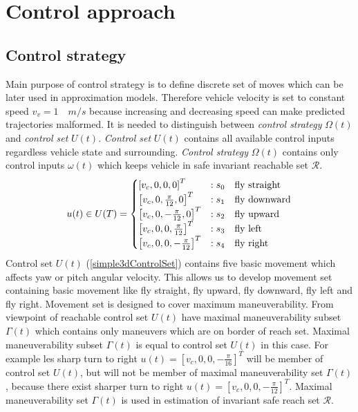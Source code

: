 \chapter{Control approach}\label{ch:controlapproach3D}


\section{Control strategy}\label{sec:3DcontrolSimplisticStrategy}
\noindent Main purpose of control strategy is to define discrete set of moves which can be later used in approximation models. Therefore vehicle velocity is set to constant speed $v_v = 1\quad m/s$ because increasing and decreasing speed can make predicted trajectories malformed. It is needed to distinguish between \textit{control strategy} $\Omega(t)$ and \textit{control set} $U(t)$. \textit{Control set} $U(t)$ contains all available control inputs regardless vehicle state and surrounding. \textit{Control strategy} $\Omega(t)$ contains only control inputs $\omega(t)$ which keeps vehicle in safe invariant reachable set $\mathscr{R}$.
\begin{equation}\label{simple3dControlSet}
    u(t)\in U(T) =
    \begin{cases}
        \left [ v_c,0,0,0 \right ]^T & :s_0 \quad\textnormal{fly straight} \\
        \left [ v_c,0,\frac{\pi}{12},0 \right ]^T & :s_1 \quad\textnormal{fly downward} \\
        \left [ v_c,0,-\frac{\pi}{12},0 \right ]^T & :s_2 \quad\textnormal{fly upward} \\
        \left [ v_c,0,0,\frac{\pi}{12} \right ]^T & :s_3 \quad\textnormal{fly left} \\
        \left [ v_c,0,0,-\frac{\pi}{12} \right ]^T & :s_4 \quad\textnormal{fly right} 
    \end{cases}
\end{equation}
Control set $U(t)$ (\ref{simple3dControlSet}) contains five basic movement which affects yaw or pitch angular velocity. This allows us to develop movement set containing basic movement like fly straight, fly upward, fly downward, fly left and fly right. Movement set  is designed to cover maximum maneuverability. From viewpoint of reachable control set $U(t)$ have maximal maneuverability subset $\Gamma(t)$ which contains only maneuvers which are on border of reach set. Maximal maneuverability subset $\Gamma(t)$ is equal to control set $U(t)$ in this case. For example les sharp turn to right $u(t)=\left [ v_c,0,0,-\frac{\pi}{16} \right ]^T$ will be member of control set $U(t)$, but will not be member of maximal maneuverability set $\Gamma(t)$, because there exist sharper turn to right $u(t) = \left [ v_c,0,0,-\frac{\pi}{12} \right ]^T $. Maximal maneuverability set $\Gamma(t)$ is used in estimation of invariant safe reach set $\mathscr{R}$.

